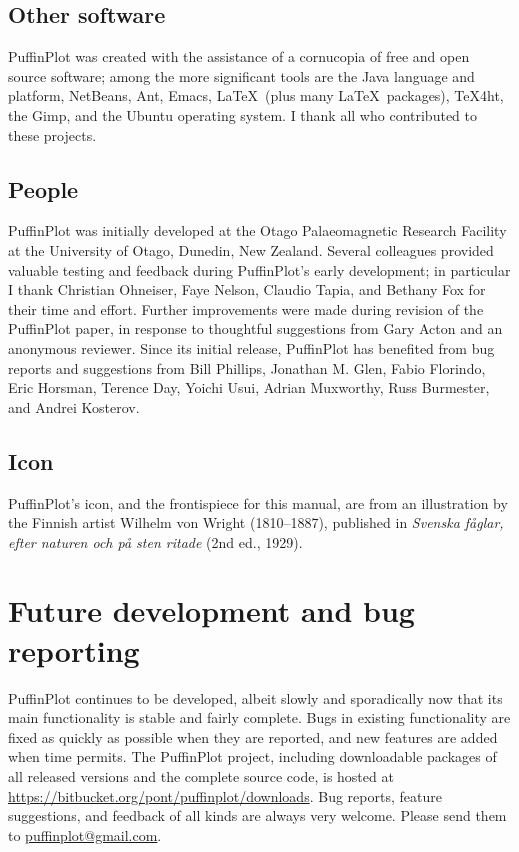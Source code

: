 \documentclass[a4paper,british]{article}
\begin{document}
\subsection*{Other software}

PuffinPlot was created with the assistance of a cornucopia of free and
open source software; among the more significant tools are the Java
language and platform, NetBeans, Ant, Emacs, \LaTeX\ (plus many
\LaTeX\ packages), TeX4ht, the Gimp, and the Ubuntu operating system. I
thank all who contributed to these projects.

\subsection*{People}

PuffinPlot was initially developed at the Otago Palaeomagnetic Research
Facility at the University of Otago, Dunedin, New Zealand. Several
colleagues provided valuable testing and feedback during PuffinPlot's
early development; in particular I thank Christian Ohneiser, Faye
Nelson, Claudio Tapia, and Bethany Fox for their time and effort.
Further improvements were made during revision of the PuffinPlot paper,
in response to thoughtful suggestions from Gary Acton and an anonymous
reviewer. Since its initial release, PuffinPlot has benefited from bug
reports and suggestions from Bill Phillips, Jonathan M. Glen, Fabio
Florindo, Eric Horsman, Terence Day, Yoichi Usui, Adrian Muxworthy,
Russ Burmester, and Andrei Kosterov.

\subsection*{Icon}

PuffinPlot's icon, and the frontispiece for this manual, are from an
illustration by the Finnish artist Wilhelm von Wright (1810--1887), published
in \emph{Svenska f\aa glar, efter naturen och p\aa{} sten ritade} (2nd ed.,
1929).


\section{Future development and bug reporting}

PuffinPlot continues to be developed, albeit slowly and sporadically now
that its main functionality is stable and fairly complete. Bugs in
existing functionality are fixed as quickly as possible when they are
reported, and new features are added when time permits. The PuffinPlot
project, including downloadable packages of all released versions and
the complete source code, is hosted at
\url{https://bitbucket.org/pont/puffinplot/downloads}. Bug reports,
feature suggestions, and feedback of all kinds are always very welcome.
Please send them to
\textsf{\href{mailto:puffinplot@gmail.com}{puffinplot@gmail.com}}.
\end{document}
